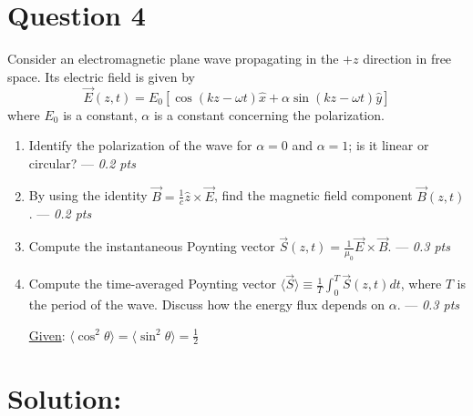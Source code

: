 \section*{Question 4}
Consider an electromagnetic plane wave propagating in the $+z$ direction in free space. Its electric field is given by
\[
\vec{E}(z,t) = E_0 \left[ \cos(kz-\omega t) \hat{x} + \alpha \sin(kz - \omega t) \hat{y}\right]
\]
where $E_0$ is a constant, $\alpha$ is a constant concerning the polarization.
\begin{enumerate}
    \item [(a)] Identify the polarization of the wave for $\alpha = 0$ and $\alpha = 1$; is it linear or circular? --- \textit{0.2 pts}
    \item[(b)] By using the identity $\vec{B}=\frac{1}{c}\hat{z}\times\vec{E}$, find the magnetic field component $\vec{B}(z,t)$. --- \textit{0.2 pts}
    \item[(c)] Compute the instantaneous Poynting vector $\vec{S}(z,t)=\frac{1}{\mu_0} \vec{E} \times \vec{B}$. --- \textit{0.3 pts}
    \item[(d)] Compute the time-averaged Poynting vector $\langle \vec{S} \rangle \equiv \frac{1}{T} \int_0^T \vec{S}(z,t) dt$, where $T$ is the period of the wave. Discuss how the energy flux depends on $\alpha$. --- \textit{0.3 pts}
    
    \underline{Given}: $\langle \cos^2\theta \rangle = \langle \sin^2\theta \rangle = \frac{1}{2}$ 
\end{enumerate}

 \section*{Solution:}

